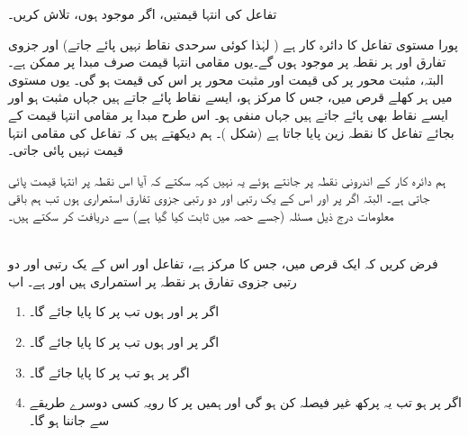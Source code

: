 تفاعل  کی انتہا قیمتیں، اگر موجود ہوں، تلاش کریں۔

 پورا مستوی  تفاعل  کا دائرہ کار   ہے ( لہٰذا کوئی سرحدی نقاط نہیں پائے جاتے) اور جزوی تفارق  اور  ہر  نقطہ پر موجود ہوں گے۔یوں مقامی انتہا قیمت صرف مبدا پر ممکن ہے۔ البتہ، مثبت محور  پر   کی قیمت  اور مثبت محور  پر اس کی قیمت  ہو گی۔ یوں  مستوی  میں ہر  کھلے قرص میں، جس کا مرکز   ہو،   ایسے نقاط پائے جاتے ہیں جہاں  مثبت ہو اور ایسے نقاط بھی پائے جاتے ہیں جہاں  منفی ہو۔  اس طرح مبدا پر مقامی انتہا قیمت کے بجائے  تفاعل کا نقطہ زین پایا جاتا ہے (شکل )۔ ہم دیکھتے ہیں کہ تفاعل کی  مقامی انتہا قیمت نہیں پائی جاتی۔

ہم  دائرہ کار  کے اندرونی نقطہ  پر   جانتے ہوئے یہ نہیں  کہہ سکتے  کہ آیا اس نقطہ پر انتہا قیمت پائی جاتی ہے۔ البتہ اگر  پر   اور اس کے یک رتبی اور دو رتبی  جزوی تفارق استمراری ہوں  تب ہم باقی معلومات درج ذیل مسئلہ (جسے حصہ  میں ثابت کیا گیا ہے) سے دریافت کر سکتے ہیں۔

\\
فرض کریں کہ ایک قرص میں، جس  کا مرکز  ہے،  تفاعل  اور اس کے یک رتبی اور دو رتبی   جزوی تفارق ہر نقطہ پر  استمراری ہیں  اور  ہے۔ اب
\begin{enumerate}[1.]
\item
اگر  پر  اور  ہوں    تب  پر  کا  پایا جائے گا۔
\item
اگر  پر  اور  ہوں   تب  پر  کا  پایا  جائے گا۔
\item
اگر  پر   ہو   تب  پر  کا پایا جائے گا۔
\item
اگر   پر  ہو تب یہ   پرکھ غیر فیصلہ کن ہو  گی اور ہمیں  پر  کا رویہ  کسی دوسرے طریقے  سے جاننا ہو گا۔
\end{enumerate}

